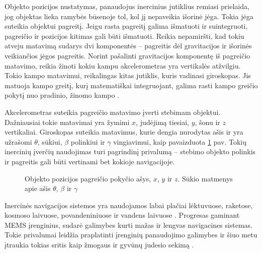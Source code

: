 Objekto pozicijos nustatymas, panaudojus inercinius jutiklius remiasi prielaida, jog objektas lieka ramybės būsenoje tol, kol jį nepaveikia išorinė jėga. Tokia jėga suteikia objektui pagreitį. Jeigu rasta pagreitį galima išmatuoti ir suintegruoti, pagreičio ir pozicijos kitimas gali būti išmatuoti. Reikia nepamiršti, kad tokiu atveju matavimą sudarys dvi komponentės -- pagreitis dėl gravitacijos ir išorinės veikiančios jėgos pagreitis. Norint pašalinti gravitacijos komponentę iš pagreičio matavimo, reikia žinoti kokiu kampu akcelerometras yra vertikalės atžvilgiu.
Tokio kampo matavimui, reikalingas kitas jutiklis, kuris vadinasi giroskopas. Jis matuoja kampo greitį, kurį matematiškai integruojant, galima rasti kampo greičio pokytį nuo pradinio, žinomo kampo \cite{sukkarieh2000low}.

Akcelerometras suteikia pagreičio matavimo įverti stebimam objektui. Dažniausiai tokie matavimai yra žymimi $x$, judėjimą tiesiai, $y$, šonu ir $z$ vertikaliai. Giroskopas suteikia matavimus, kurie dengia nurodytas ašis ir yra užrašomi $\theta$, sūkiui, $\beta$ polinkiui ir $\gamma$ vingiavimui, kaip pavaizduota \ref{tikz:axis_of_the_system} pav. Tokių inercinių įverčių naudojimas turi pagrindinį privalumą -- stebimo objekto polinkis ir pagreitis gali būti vertinami bet kokioje navigacijoje.  

\begin{figure}[H]
    \centering
    \caption{Objekto pozicijos pagreičio pokyčio ašys, $x$, $y$ ir $z$. Sūkio matmenys apie ašis $\theta$, $\beta$ ir $\gamma$}
    \label{tikz:axis_of_the_system}
\end{figure}

Inercinės navigacijos sistemos yra naudojamos labai plačiai lėktuvuose, raketose, kosmoso laivuose, povandeniniuose ir vandens laivuose \cite{woodman2007introduction}. Progresas gaminant MEMS įrenginius, sudarė galimybes kurti mažas ir lengvas navigacines sistemas. Tokie privalumai leidžia praplatinti įrenginių panaudojimo galimybes ir šiuo metu įtraukia tokias sritis kaip žmogaus ir gyvūnų judesio sekimą \cite{schlomer2008gesture,suvorova2012action}.

